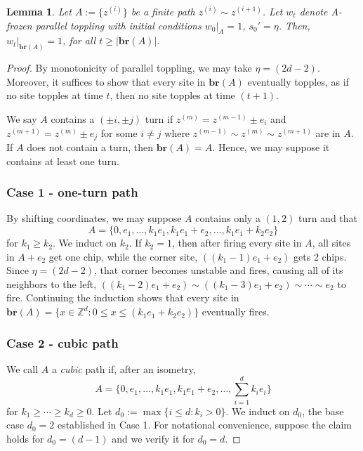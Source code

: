 \documentclass[aap]{imsart}
\newcommand{\Z}{\mathbb{Z}}
\newcommand{\br}{\mathbf{br}}  %
\newtheorem{lemma}[theorem]{Lemma}
\begin{document}
\begin{lemma}\label{lemma:local_convexity}
	Let $A := \{z^{(i)}\}$ be a finite path $z^{(i)} \sim z^{(i+1)}$.
	Let $w_t$ denote $A$-frozen parallel toppling with initial conditions 
	$w_0|_{A} = 1$, $s_0' = \eta$. Then, $w_t|_{\br(A)} = 1$, for all $t \geq |\br(A)|$.   
\end{lemma}
\begin{proof}
	By monotonicity of parallel toppling, we may take $\eta = (2 d - 2)$. Moreover, 
	it suffices to show that every site in $\br(A)$ eventually topples, as if no site topples at time $t$, then no site topples at time $(t+1)$.
	
	We say $A$ contains a $( \pm i, \pm j)$ turn if $z^{(m)} = z^{(m-1)} \pm  e_i$ and $z^{(m+1)} = z^{(m)} \pm e_j$
	for some $i \not = j$ where $z^{(m-1)} \sim z^{(m)} \sim z^{(m+1)}$ are in $A$.
	If $A$ does not contain a turn, then $\br(A) = A$. Hence, we may suppose it contains at least one turn.
	
	\subsubsection*{Case 1 - one-turn path}
	By shifting coordinates, we may suppose $A$ contains only a $(1,2)$ turn and that 
	\begin{equation}
	A = \{ 0, e_1, \ldots, k_1 e_1, k_1 e_1 + e_2, \ldots, k_1 e_1 + k_2 e_2 \}
	\end{equation}
	for $k_1 \geq k_2$.	We induct on $k_2$. If $k_2 = 1$, then after firing every site in $A$, 
	all sites in $A + e_2$ get one chip, while the corner site,
	$((k_1 - 1) e_1 + e_2)$ gets 2 chips. Since $\eta = (2 d- 2)$, that corner becomes unstable and fires, 
	causing all of its neighbors to the left, $((k_1 - 2) e_1 + e_2) \sim ((k_1 - 3) e_1 + e_2) \sim \cdots \sim e_2$ to fire. Continuing the induction shows that every site in $\br(A) = \{ x \in \Z^d : 0 \leq x \leq (k_1 e_1 + k_2 e_2)\}$ eventually fires. 
	
	\subsubsection*{Case 2 - cubic path} 
	We call $A$ a {\it cubic} path if, after an isometry, 
	\begin{equation}
	A = \{ 0, e_1, \ldots, k_1 e_1, k_1 e_1 + e_2, \ldots, \sum_{i=1}^d k_i e_i \}
	\end{equation}
	for $k_1 \geq \cdots \geq k_d \geq 0$. Let $d_0 := \max \{ i \leq d : k_i > 0 \}$. We induct on $d_0$, the base case $d_0 = 2$ established in Case 1. 
	For notational convenience, suppose the claim holds for $d_0 = (d-1)$ and we verify it for $d_0 = d$.
	

\end{proof}
\end{document}
